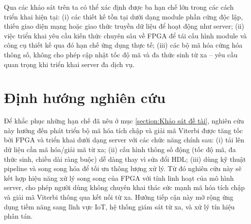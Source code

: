 \documentclass[../DoAn.tex]{subfiles}
\begin{document}
Qua các khảo sát trên ta có thể xác định được ba hạn chế lớn trong các cách triển khai hiện tại: (i) các thiết kế tồn tại dưới dạng module phần cứng độc lập, thiếu giao diện mạng hoặc giao thức truyền dữ liệu để hoạt động như server; (ii) việc triển khai yêu cầu kiến thức chuyên sâu về FPGA để tái cấu hình module và công cụ thiết kế qua đó hạn chế ứng dụng thực tế; (iii) các bộ mã hóa cứng hóa thông số, không cho phép cập nhật tốc độ mã và đa thức sinh từ xa – yêu cầu quan trọng khi triển khai server đa dịch vụ.

\section{Định hướng nghiên cứu}

Để khắc phục những hạn chế đã nêu ở mục \ref{section:Khảo sát đề tài}, nghiên cứu này hướng đến phát triển bộ mã hóa tích chập và giải mã Viterbi được tăng tốc bởi FPGA và triển khai dưới dạng server với các chức năng chính sau: (i) tải lên dữ liệu cần mã hóa/giải mã từ xa; (ii) cấu hình thông số động (tốc độ mã, đa thức sinh, chiều dài ràng buộc) dễ dàng thay vì sửa đổi HDL; (iii) dùng kỹ thuật pipeline và song song hóa để tối ưu thông lượng xử lý. Từ đó nghiên cứu này sẽ kết hợp hiệu năng xử lý song song của FPGA với tính linh hoạt của mô hình server, cho phép người dùng không chuyên khai thác sức mạnh mã hóa tích chập và giải mã Viterbi thông qua kết nối từ xa. Hướng tiếp cận này mở rộng ứng dụng tiềm năng sang lĩnh vực IoT, hệ thống giám sát từ xa, và xử lý tín hiệu phân tán.

\end{document}
